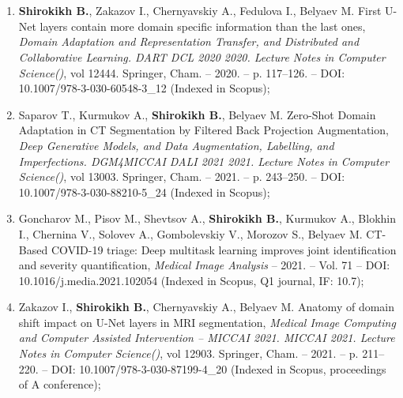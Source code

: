 

\section*{\bibtitleauthorEn}


\begin{enumerate}
	
	\item \textbf{Shirokikh B.}, Zakazov I., Chernyavskiy A., Fedulova I., Belyaev M. First U-Net layers contain more domain specific information than the last ones, \textit{Domain Adaptation and Representation Transfer, and Distributed and Collaborative Learning. DART DCL 2020 2020. Lecture Notes in Computer Science()}, vol 12444. Springer, Cham. -- 2020. -- p. 117--126. -- DOI: 10.1007/978-3-030-60548-3\_12 (Indexed in Scopus);
	
    \item Saparov T., Kurmukov A., \textbf{Shirokikh B.}, Belyaev M. Zero-Shot Domain Adaptation in CT Segmentation by Filtered Back Projection Augmentation, \textit{Deep Generative Models, and Data Augmentation, Labelling, and Imperfections. DGM4MICCAI DALI 2021 2021. Lecture Notes in Computer Science()}, vol 13003. Springer, Cham. -- 2021. -- p. 243--250. -- DOI: 10.1007/978-3-030-88210-5\_24 (Indexed in Scopus);
    
    \item Goncharov M.\footnotemark[1], Pisov M.\footnotemark[1], Shevtsov A.\footnotemark[1], \textbf{Shirokikh B.}\footnotemark[1], Kurmukov A., Blokhin I., Chernina V., Solovev A., Gombolevskiy V., Morozov S., Belyaev M. CT-Based COVID-19 triage: Deep multitask learning improves joint identification and severity quantification, \textit{Medical Image Analysis} -- 2021. -- Vol. 71 -- DOI: 10.1016/j.media.2021.102054  (Indexed in Scopus, Q1 journal, IF: 10.7);
    
    \item  Zakazov I.\footnotemark[2], \textbf{Shirokikh B.}\footnotemark[2], Chernyavskiy A., Belyaev M. Anatomy of domain shift impact on U-Net layers in MRI segmentation, \textit{Medical Image Computing and Computer Assisted Intervention -- MICCAI 2021. MICCAI 2021. Lecture Notes in Computer Science()}, vol 12903. Springer, Cham. -- 2021. -- p. 211--220. -- DOI: 10.1007/978-3-030-87199-4\_20  (Indexed in Scopus, proceedings of A conference);
    

\end{enumerate}
